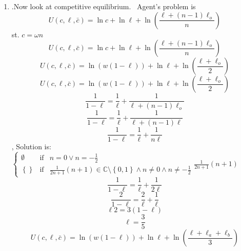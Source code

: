 \documentclass{article}
\begin{document}
\begin{enumerate}
\item .Now look at competitive equilibrium. \ Agent's problem is 
\begin{equation*}
U\left( c,\ell ,\bar{c}\right) =\ln c+\ln \ell +\ln \left( \frac{\ell
+\left( n-1\right) \ell _{o}}{n}\right) 
\end{equation*}%
st. $c=\omega n$%
\begin{equation*}
U\left( c,\ell ,\bar{c}\right) =\ln c+\ln \ell +\ln \left( \frac{\ell
+\left( n-1\right) \ell _{o}}{n}\right) 
\end{equation*}%
\begin{equation*}
U\left( c,\ell ,\bar{c}\right) =\ln \left( w\left( 1-\ell \right) \right)
+\ln \ell +\ln \left( \frac{\ell +\ell _{o}}{2}\right) 
\end{equation*}%
\begin{equation*}
U\left( c,\ell ,\bar{c}\right) =\ln \left( w\left( 1-\ell \right) \right)
+\ln \ell +\ln \left( \frac{\ell +\ell _{o}}{2}\right) 
\end{equation*}%
\begin{equation*}
\frac{1}{1-\ell }=\frac{1}{\ell }+\frac{1}{\ell +\left( n-1\right) \ell _{o}}
\end{equation*}%
\begin{equation*}
\frac{1}{1-\ell }=\frac{1}{\ell }+\frac{1}{\ell +\left( n-1\right) \ell }
\end{equation*}%
\begin{equation*}
\frac{1}{1-\ell }=\frac{1}{\ell }+\frac{1}{n\ell }
\end{equation*}%
, Solution is: $\left\{ 
\begin{array}{ccc}
\emptyset  & \text{if} & n=0\vee n=-\frac{1}{2} \\ 
\left\{ {}\right\}  & \text{if} & \frac{1}{2n+1}\left( n+1\right) \in 
\mathbb{C}
\setminus \left\{ 0,1\right\} \wedge n\neq 0\wedge n\neq -\frac{1}{2}%
\end{array}%
\right. \allowbreak \frac{1}{2n+1}\left( n+1\right) $%
\begin{equation*}
\frac{1}{1-\ell }=\frac{1}{\ell }+\frac{1}{2\ell }
\end{equation*}%
\begin{equation*}
\frac{2}{1-\ell }=\frac{2}{\ell }+\frac{1}{\ell }
\end{equation*}%
\begin{equation*}
\ell 2=3\left( 1-\ell \right) 
\end{equation*}%
\begin{equation*}
\ell =\frac{3}{5}
\end{equation*}%
\begin{equation*}
U\left( c,\ell ,\bar{c}\right) =\ln \left( w\left( 1-\ell \right) \right)
+\ln \ell +\ln \left( \frac{\ell +\ell _{a}+\ell _{b}}{3}\right) 
\end{equation*}
\end{enumerate}
\end{document}
